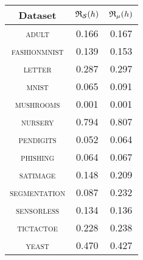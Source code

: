 \begin{tabular}{c|cc}
\toprule
Dataset & {\scriptsize $\mathfrak{R}_{\mathcal{S}}(h)$} & {\scriptsize $\mathfrak{R}_{\mu}(h)$} \\
\midrule
\textsc{\footnotesize adult} & 0.166 & 0.167 \\
\textsc{\footnotesize fashionmnist} & 0.139 & 0.153 \\
\textsc{\footnotesize letter} & 0.287 & 0.297 \\
\textsc{\footnotesize mnist} & 0.065 & 0.091 \\
\textsc{\footnotesize mushrooms} & 0.001 & 0.001 \\
\textsc{\footnotesize nursery} & 0.794 & 0.807 \\
\textsc{\footnotesize pendigits} & 0.052 & 0.064 \\
\textsc{\footnotesize phishing} & 0.064 & 0.067 \\
\textsc{\footnotesize satimage} & 0.148 & 0.209 \\
\textsc{\footnotesize segmentation} & 0.087 & 0.232 \\
\textsc{\footnotesize sensorless} & 0.134 & 0.136 \\
\textsc{\footnotesize tictactoe} & 0.228 & 0.238 \\
\textsc{\footnotesize yeast} & 0.470 & 0.427 \\
\bottomrule
\end{tabular}
